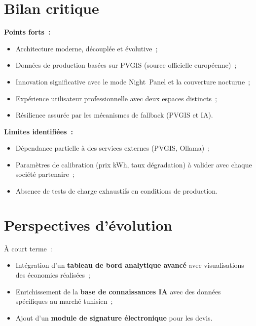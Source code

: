 \section*{Bilan critique}

\textbf{Points forts~:}
\begin{itemize}
  \item Architecture moderne, découplée et évolutive~;
  \item Données de production basées sur PVGIS (source officielle européenne)~;
  \item Innovation significative avec le mode Night~Panel et la couverture nocturne~;
  \item Expérience utilisateur professionnelle avec deux espaces distincts~;
  \item Résilience assurée par les mécanismes de fallback (PVGIS et IA).
\end{itemize}

\textbf{Limites identifiées~:}
\begin{itemize}
  \item Dépendance partielle à des services externes (PVGIS, Ollama)~;
  \item Paramètres de calibration (prix kWh, taux dégradation) à valider avec
    chaque société partenaire~;
  \item Absence de tests de charge exhaustifs en conditions de production.
\end{itemize}

\section*{Perspectives d'évolution}

À court terme~:
\begin{itemize}
  \item Intégration d'un \textbf{tableau de bord analytique avancé} avec
    visualisations des économies réalisées~;
  \item Enrichissement de la \textbf{base de connaissances IA} avec des
    données spécifiques au marché tunisien~;
  \item Ajout d'un \textbf{module de signature électronique} pour les devis.
\end{itemize}

